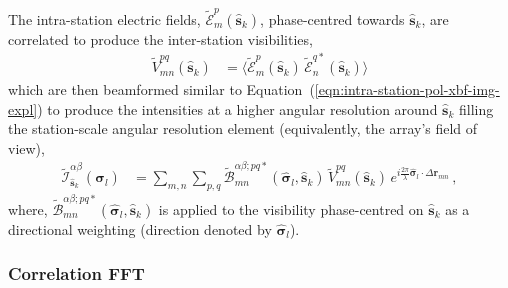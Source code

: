 \documentclass[
  journal=pasa,
  manuscript=article-type,
  year=2020,
  volume=37,
]{cup-journal}
\begin{document}
The intra-station electric fields,
$\widetilde{\mathcal{E}}_m^p(\hat{\boldsymbol{s}}_k)$, phase-centred towards $\hat{\boldsymbol{s}}_k$, are correlated to produce the inter-station visibilities, 
\begin{align}
    \widetilde{V}_{mn}^{pq}(\hat{\boldsymbol{s}}_k) &= \bigl\langle \widetilde{\mathcal{E}}_m^p(\hat{\boldsymbol{s}}_k) \, \widetilde{\mathcal{E}}_n^{q*}(\hat{\boldsymbol{s}}_k)\bigr\rangle \label{eqn:inter-station-pol-visibilities}
\end{align}
which are then beamformed similar to Equation~(\ref{eqn:intra-station-pol-xbf-img-expl}) to produce the intensities at a higher angular resolution around $\hat{\boldsymbol{s}}_k$ filling the station-scale angular resolution element (equivalently, the array's field of view),
\begin{align}
    \widetilde{\mathcal{I}}^{\alpha\beta}_{\hat{\boldsymbol{s}}_k}(\hat{\boldsymbol{\sigma}}_l)
    &= \sum_{m,n} \sum_{p,q} \widetilde{\mathcal{B}}_{mn}^{\alpha\beta;pq*}(\hat{\boldsymbol{\sigma}}_l, \hat{\boldsymbol{s}}_k) \, \widetilde{V}_{mn}^{pq}(\hat{\boldsymbol{s}}_k) \,  e^{i\frac{2\pi}{\lambda} \hat{\boldsymbol{\sigma}}_l\cdot\Delta\boldsymbol{r}_{m n}} \, , \label{eqn:inter-station-pol-xbf-img-expl} 
\end{align}
where, $\widetilde{\mathcal{B}}_{mn}^{\alpha\beta;pq*}(\hat{\boldsymbol{\sigma}}_l,\hat{\boldsymbol{s}}_k)$ is applied to the visibility phase-centred on $\hat{\boldsymbol{s}}_k$ as a directional weighting (direction denoted by $\hat{\boldsymbol{\sigma}}_l$).  

\subsubsection{Correlation FFT}
\end{document}

